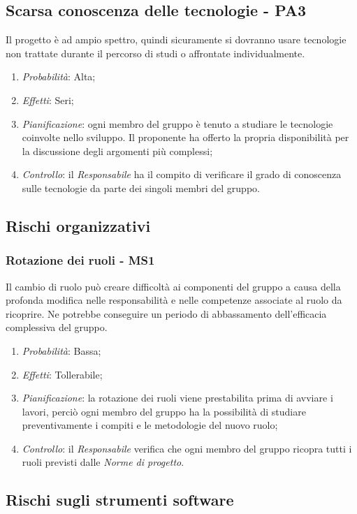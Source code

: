 \subsection{Scarsa conoscenza delle tecnologie - PA3}
Il progetto \`e ad ampio spettro, quindi sicuramente si dovranno usare tecnologie non trattate durante il percorso di studi o affrontate individualmente.
\begin{enumerate}
\item \textit{Probabilit\`a}: Alta;
\item \textit{Effetti}: Seri;
\item \textit{Pianificazione}: ogni membro del gruppo \`e tenuto a studiare le tecnologie coinvolte nello sviluppo. Il proponente ha offerto la propria disponibilit\`a per la discussione degli argomenti pi\`u complessi;
\item \textit{Controllo}: il \textit{Responsabile} ha il compito di verificare il grado di conoscenza sulle tecnologie da parte dei singoli membri del gruppo.
\end{enumerate}

\subsection{Rischi organizzativi}
\subsubsection{Rotazione dei ruoli - MS1}
Il cambio di ruolo pu\`o creare difficolt\`a ai componenti del gruppo a causa della profonda modifica nelle responsabilit\`a e nelle competenze associate al ruolo da ricoprire. Ne potrebbe conseguire un periodo di abbassamento dell'efficacia complessiva del gruppo.
\begin{enumerate}
\item \textit{Probabilit\`a}: Bassa;
\item \textit{Effetti}: Tollerabile;
\item \textit{Pianificazione}: la rotazione dei ruoli viene prestabilita prima di avviare i lavori, perci\`o ogni membro del gruppo ha la possibilit\`a di studiare preventivamente i compiti e le metodologie del nuovo ruolo;
\item \textit{Controllo}: il \textit{Responsabile} verifica che ogni membro del gruppo ricopra tutti i ruoli previsti dalle \textit{Norme di progetto}.
\end{enumerate}

\subsection{Rischi sugli strumenti software}
